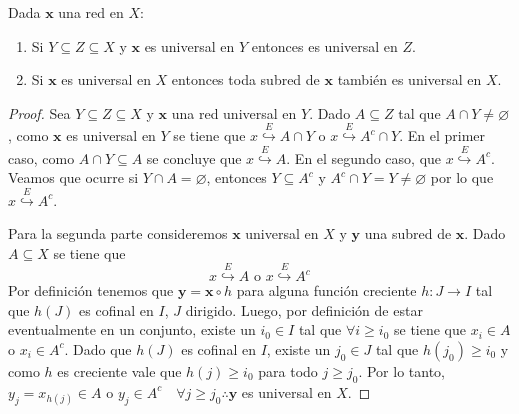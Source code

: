 \documentclass{article}
\theoremstyle{plain}
\theoremstyle{definition}
\newcommand{\evto}[1]{\stackrel{E}{\hookrightarrow} #1}   %
\newenvironment{ejercicio}[1]{\begin{trivlist}
\item[\hskip \labelsep {\bfseries Ejercicio}\hskip \labelsep {\bfseries #1.}]}{\end{trivlist}}
\begin{document}
\begin{ejercicio}{9}
    Dada \( \mathbf{x} \) una red en \( X \):
    \begin{enumerate}
        \item Si \( Y \subseteq Z \subseteq X \) y \( \mathbf{x} \) es universal en \( Y \) entonces es universal en \( Z \).
        \item Si \( \mathbf{x} \) es universal en \( X \) entonces toda subred de \( \mathbf{x} \) también es universal en \( X \).
    \end{enumerate}
\end{ejercicio}
\begin{proof}
    Sea \( Y \subseteq Z \subseteq X \) y \( \mathbf{x} \) una red universal en \( Y \). Dado \( A \subseteq Z \) tal que \( A \cap Y \neq \varnothing \), como \( \mathbf{x} \) es universal en \( Y \)
    se tiene que \( x \evto{A \cap Y} \) o \( x \evto{A^c \cap Y} \). En el primer caso, como \( A \cap Y \subseteq A \) se concluye que \( x \evto{A} \). En el segundo caso, que \( x \evto{A^c} \).
    Veamos que ocurre si \( Y \cap A = \varnothing \), entonces \( Y \subseteq A^c \) y \( A^c \cap Y = Y \neq \varnothing \) por lo que \( x \evto{A^c} \).

    Para la segunda parte consideremos \( \mathbf{x} \) universal en \( X \) y \( \mathbf{y} \) una subred de \( \mathbf{x} \). Dado \( A \subseteq X \) se tiene que \[
        x \evto{A} \text{ o } x\evto{A^c}
    \]
    Por definición tenemos que \( \mathbf{y} = \mathbf{x} \circ h \) para alguna función creciente \( h : J \to I \) tal que \( h(J) \) es cofinal en \( I \), \( J \) dirigido. Luego,
    por definición de estar eventualmente en un conjunto, existe un \( i_0 \in I \) tal que \( \forall i \geq i_0 \) se tiene que \( x_i \in A \) o \( x_i \in A^c \).
    Dado que \( h(J) \) es cofinal en \( I \), existe un \( j_0 \in J \) tal que \( h(j_0) \geq i_0 \) y como \( h \) es creciente vale que \( h(j) \geq i_0 \) para todo \( j \geq j_0 \). Por lo tanto,
    \( y_j = x_{h(j)} \in A \) o \( y_j \in A^c \quad \forall j \geq j_0 \therefore \mathbf{y} \) es universal en \( X \).
\end{proof}
\end{document}
